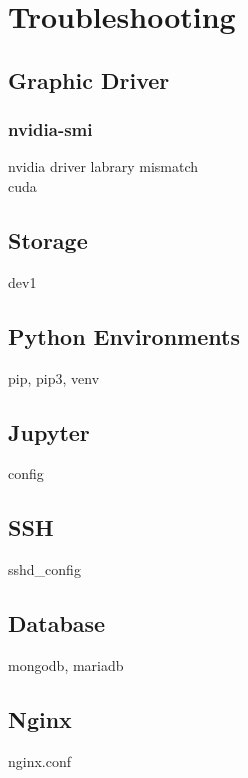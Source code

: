 \chapter{Troubleshooting}
\section{Graphic Driver}
\subsection{nvidia-smi}
nvidia driver labrary mismatch~\\

cuda
\section{Storage}
dev1
\section{Python Environments}
pip, pip3, venv
\section{Jupyter}
config
\section{SSH}
sshd\_config
\section{Database}
mongodb, mariadb
\section{Nginx}
nginx.conf